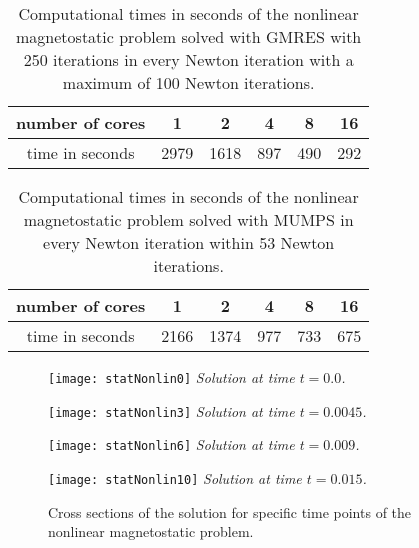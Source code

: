 \documentclass[12pt]{article}
\numberwithin{equation}{section}
\begin{document}
\begin{table}
\caption{Computational times in seconds of the nonlinear magnetostatic problem solved with GMRES with 250 iterations in every Newton iteration with a maximum of 100 Newton iterations.}
\label{table:speedup_table_quasistatic_gmres}
\begin{center}
\begin{tabular}[tbhp]{ |c|c|c|c|c|c| } 
 \hline
 number of cores & 1 & 2 & 4 & 8 & 16\\
 \hline
 time in seconds & 2979 & 1618 & 897 & 490 & 292 \\ 
 \hline
\end{tabular}
\end{center}
\end{table}

\begin{table}
\caption{Computational times in seconds of the nonlinear magnetostatic problem
  solved with MUMPS in every Newton iteration within 53 Newton iterations.}
\label{table:speedup_table_quasistatic_mumps}
\begin{center}
\begin{tabular}[tbhp]{ |c|c|c|c|c|c| } 
 \hline
 number of cores & 1 & 2 & 4 & 8 & 16\\
 \hline
 time in seconds & 2166 & 1374 & 977 & 733 & 675 \\ 
 \hline
\end{tabular}
\end{center}
\end{table}

\begin{figure}[tbhp]
\begin{minipage}{0.47\linewidth}
\begin{center}
\texttt{[image: statNonlin0]}
\textit{Solution at time $t = 0.0$.}
\end{center} 
\end{minipage}
\hfill
\vspace{0.2 cm}
\begin{minipage}{0.47\linewidth}
\begin{center}
\texttt{[image: statNonlin3]} 
\textit{Solution at time $t = 0.0045$.}
\end{center}
\end{minipage}
\vfill
\vspace{0.2 cm}
\begin{minipage}{0.47\linewidth}
\begin{center}
\texttt{[image: statNonlin6]} 
\textit{Solution at time $t = 0.009$.}
\end{center}
\end{minipage}
\hfill
\begin{minipage}{0.47\linewidth}
\begin{center}
\texttt{[image: statNonlin10]}
\textit{Solution at time $t = 0.015$.}
\end{center}
\end{minipage}
\caption{Cross sections of the solution for specific time points of the nonlinear magnetostatic problem.}
\label{fig:sol_motor_quasistat_prob}
\end{figure}
\end{document}
